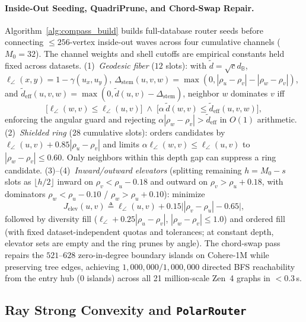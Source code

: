 \paragraph{Inside-Out Seeding, QuadriPrune, and Chord-Swap Repair.}
Algorithm~\ref{alg:compass_build} builds full-database router seeds before connecting $\le 256$-vertex inside-out waves across four cumulative channels ($M_0=32$). The channel weights and shell cutoffs are empirical constants held fixed across datasets.
(1)~\emph{Geodesic fiber} ($12$ slots): with $\tilde{d} = \sqrt{c}d_{\mathbb{B}}$, $\ell_\angle(x, y) = 1 - \hat{\gamma}(u_x, u_y)$, $\Delta_{\mathrm{stem}}(u, v, w) = \max(0, |\rho_u - \rho_v| - |\rho_w - \rho_v|)$, and $\tilde{d}_{\mathrm{eff}}(u, v, w) = \max(0, \tilde{d}(u, v) - \Delta_{\mathrm{stem}})$, neighbor $w$ dominates $v$ iff
\begin{equation}
  \bigl[\ell_\angle(w, v) \le \ell_\angle(u, v)\bigr] \;\land\; \bigl[\alpha\,\tilde{d}(w, v) \le \tilde{d}_{\mathrm{eff}}(u, v, w)\bigr],
  \label{eq:dom_geo}
\end{equation}
enforcing the angular guard and rejecting $\alpha|\rho_w - \rho_v| > \tilde{d}_{\mathrm{eff}}$ in $O(1)$ arithmetic.
(2)~\emph{Shielded ring} ($28$ cumulative slots): orders candidates by $\ell_\angle(u, v) + 0.85|\rho_u - \rho_v|$ and limits $\alpha\ell_\angle(w, v) \le \ell_\angle(u, v)$ to $|\rho_w - \rho_v| \le 0.60$. Only neighbors within this depth gap can suppress a ring candidate.
(3)--(4)~\emph{Inward/outward elevators} (splitting remaining $h = M_0 - s$ slots as $\lfloor h/2\rfloor$ inward on $\rho_v < \rho_u - 0.18$ and outward on $\rho_v > \rho_u + 0.18$, with dominators $\rho_w < \rho_u - 0.10$ / $\rho_w > \rho_u + 0.10$): minimize
\begin{equation}
  J_{\mathrm{elev}}(u, v) \triangleq \ell_\angle(u, v) + 0.15\bigl||\rho_v - \rho_u| - 0.65\bigr|,
  \label{eq:elevator_obj}
\end{equation}
followed by diversity fill ($\ell_\angle + 0.25|\rho_u - \rho_v|$, $|\rho_w - \rho_v| \le 1.0$) and ordered fill (with fixed dataset-independent quotas and tolerances; at constant depth, elevator sets are empty and the ring prunes by angle).
The chord-swap pass repairs the $521\text{--}628$ zero-in-degree boundary islands on {Cohere-1M} while preserving tree edges, achieving $1{,}000{,}000 / 1{,}000{,}000$ directed {BFS} reachability from the entry hub ($0$ islands) across all 21 million-scale {Zen~4} graphs in $<0.3$\,s.

\subsection{Ray Strong Convexity and \texttt{PolarRouter}}
\label{subsec:router}

